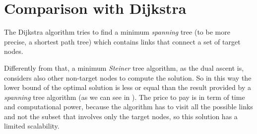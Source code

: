\section{Comparison with Dijkstra}\label{sec:comparison}

The Dijkstra algorithm tries to find a minimum \emph{spanning} tree (to be more
precise, a shortest path tree) which contains links that connect a set of target
nodes.

Differently from that, a minimum \emph{Steiner} tree algorithm, as the dual
ascent is, considers also other non-target nodes to compute the solution. So in
this way the lower bound of the optimal solution is less or equal than the
result provided by a \emph{spanning} tree algorithm (as we can see in
). The price to pay is in term of time and computational
power, because the algorithm has to visit all the possible links and not the
subset that involves only the target nodes, so this solution has a limited
scalability.

